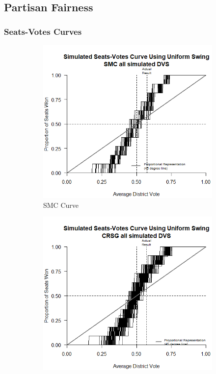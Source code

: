 \subsection{Partisan Fairness}

\subsubsection{Seats-Votes Curves}

\begin{figure}[h]
    \caption{Seats-Votes Curves for SMC- and CRSG-Generated Maps and Existing Map}
    \begin{subfigure}[b]{0.3\textwidth}
        \includegraphics[width=\textwidth]{img/sv.smc.png}
        \caption{SMC Curve}
        \label{fig:sv.smc}
    \end{subfigure}
    \hfill
    \begin{subfigure}[b]{0.3\textwidth}
        \includegraphics[width=\textwidth]{img/sv.crsg.png}

\end{subfigure}
\end{figure}
